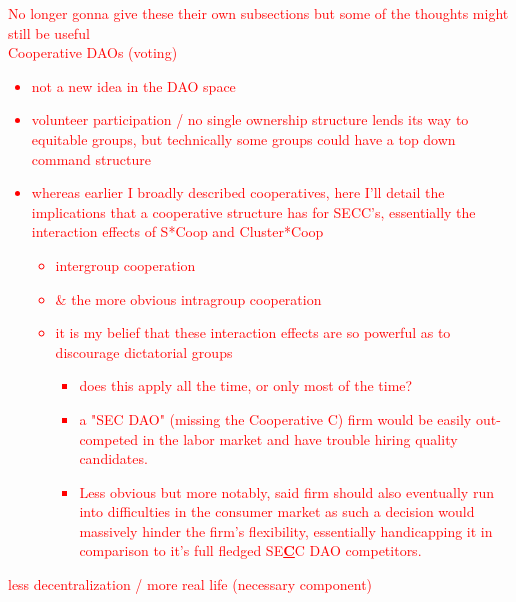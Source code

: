 \documentclass{article}[10pt]
\begin{document}
\textcolor{red}{No longer gonna give these their own subsections but some of the thoughts might still be useful}\\

\noindent \textcolor{red}{Cooperative DAOs (voting)}
\label{subsection:cooperative2}
\textcolor{red}{\begin{itemize}
    \item not a new idea in the DAO space
    \item volunteer participation / no single ownership structure lends its way to equitable groups, but technically some groups could have a top down command structure
    \item whereas earlier I broadly described cooperatives, here I'll detail the implications that a cooperative structure has for SECC's, essentially the interaction effects of S*Coop and Cluster*Coop
    \begin{itemize}
        \item intergroup cooperation
        \item \& the more obvious intragroup cooperation
        \item it is my belief that these interaction effects are so powerful as to discourage dictatorial groups
        \begin{itemize}
            \item does this apply all the time, or only most of the time?
            \item a "SEC DAO" (missing the Cooperative C) firm would be easily out-competed in the labor market and have trouble hiring quality candidates.
            \item Less obvious but more notably, said firm should also eventually run into difficulties in the consumer market as such a decision would massively hinder the firm's flexibility, essentially handicapping it in comparison to it's full fledged SE\textbf{\underline{C}}C DAO competitors.
        \end{itemize}
    \end{itemize}
\end{itemize}}

\noindent \textcolor{red}{less decentralization / more real life (necessary component)}
\end{document}
